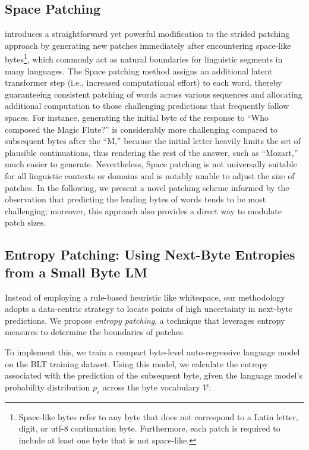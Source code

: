 \subsection{Space Patching}
\label{section:white-patch}

\citet{slagle2024spacebyte} introduces a straightforward yet powerful modification to the strided patching approach by generating new patches immediately after encountering space-like bytes\footnote{
    Space-like bytes refer to any byte that does not correspond to a Latin letter, digit, or utf-8 continuation byte. Furthermore, each patch is required to include at least one byte that is not space-like. }, which commonly act as natural boundaries for linguistic segments in many languages. The Space patching method assigns an additional latent transformer step (i.e., increased computational effort) to each word, thereby guaranteeing consistent patching of words across various sequences and allocating additional computation to those challenging predictions that frequently follow spaces. For instance, generating the initial byte of the response to ``Who composed the Magic Flute?\uline{\hspace{.6em}}'' is considerably more challenging compared to subsequent bytes after the ``M,'' because the initial letter heavily limits the set of plausible continuations, thus rendering the rest of the answer, such as ``Mozart,'' much easier to generate. Nevertheless, Space patching is not universally suitable for all linguistic contexts or domains and is notably unable to adjust the size of patches. In the following, we present a novel patching scheme informed by the observation that predicting the leading bytes of words tends to be most challenging; moreover, this approach also provides a direct way to modulate patch sizes.

\subsection{Entropy Patching: Using Next-Byte Entropies from a Small Byte LM}
\label{section:dyn-patch}

Instead of employing a rule-based heuristic like whitespace, our methodology adopts a data-centric strategy to locate points of high uncertainty in next-byte predictions. We propose \textit{entropy patching}, a technique that leverages entropy measures to determine the boundaries of patches.

To implement this, we train a compact byte-level auto-regressive language model on the {\textsc BLT} training dataset. Using this model, we calculate the entropy associated with the prediction of the subsequent byte, given the language model’s probability distribution $p_{e}$ across the byte vocabulary $\mathcal{V}$:

